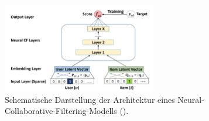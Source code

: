 \begin{figure}[H]
    \centering
    \includegraphics[width=0.6\textwidth]{content/figures/png/img_ncf_diagram.png}
    \caption{Schematische Darstellung der Architektur eines 
    Neural-Collaborative-Filtering-Modells (\Cite{he_neural_2017}).}
    \label{fig:ncf_architektur}
\end{figure}
